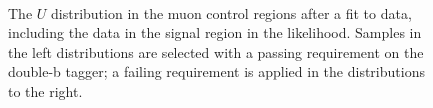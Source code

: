 \begin{figure}
  \\
\caption{The $U$ distribution in the muon control regions after a fit to data, including the data in the signal region in the likelihood. Samples in the left distributions are selected with a passing requirement on the double-b tagger; a failing requirement is applied in the distributions to the right.}
\label{Fig_cr_1}
\end{figure}

